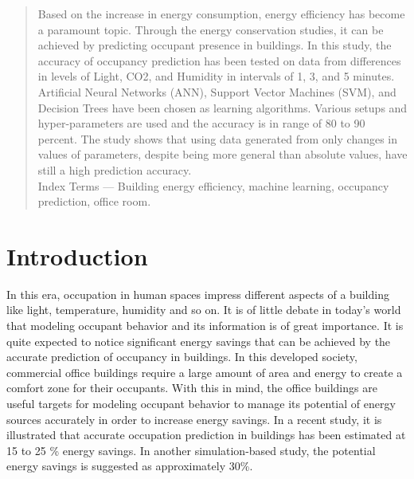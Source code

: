 \documentclass[conference]{IEEEtran}
\begin{document}
\begin{abstract}
Based on the increase in energy
consumption, energy efficiency has become a
paramount topic. Through the energy conservation
studies, it can be achieved by predicting occupant
presence in buildings. In this study, the accuracy of
occupancy prediction has been tested on data from
differences in levels of Light, CO2, and Humidity in
intervals of 1, 3, and 5 minutes. Artificial Neural
Networks (ANN), Support Vector Machines (SVM), and
Decision Trees have been chosen as learning
algorithms. Various setups and hyper-parameters are
used and the accuracy is in range of 80 to 90 percent.
The study shows that using data generated from only
changes in values of parameters, despite being more
general than absolute values, have still a high prediction
accuracy.\\

Index Terms --- Building energy efficiency, machine
learning, occupancy prediction, office room.
\end{abstract}



\section{Introduction}
In this era, occupation in human spaces impress
different aspects of a building like light, temperature,
humidity and so on. It is of little debate in today’s world
that modeling occupant behavior and its information is of
great importance. It is quite expected to notice significant
energy savings that can be achieved by the accurate
prediction of occupancy in buildings. In this developed
society, commercial office buildings require a large
amount of area and energy to create a comfort zone for
their occupants\cite{OccMeasure}. With this in mind, the office buildings are useful targets for modeling occupant behavior to manage its potential of energy sources accurately in order to increase energy savings. In a recent study, it is illustrated that accurate occupation prediction in buildings has been estimated at 15 to 25 \% energy savings\cite{ReductoHVAC}. In another simulation-based study\cite{SensorOcc}, the potential energy savings is suggested as approximately 30\%.\\
\end{document}
